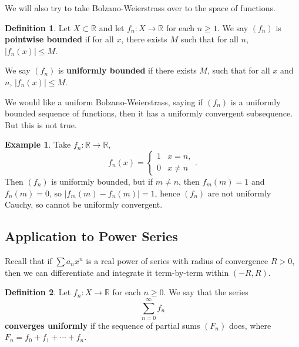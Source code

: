 \documentclass[12pt]{article}
\theoremstyle{definition}
\newtheorem{definition}{Definition}[section]
\newtheorem{example}{Example}[section]
\theoremstyle{remark}
\begin{document}
We will also try to take Bolzano-Weierstrass over to the space of functions.

\begin{definition}
	Let $X \subset \mathbb{R}$ and let $f_n : X \to \mathbb{R}$ for each $n \geq 1$. We say $(f_n)$ is \textbf{pointwise bounded} if for all $x$, there exists $M$ such that for all $n$, $|f_n(x)| \leq M$.

	We say $(f_n)$ is \textbf{uniformly bounded} if there exists $M$, such that for all $x$ and $n$, $|f_n(x)| \leq M$.
\end{definition}

We would like a uniform Bolzano-Weierstrass, saying if $(f_n)$ is a uniformly bounded sequence of functions, then it has a uniformly convergent subsequence. But this is not true.

\begin{adjustbox}{minipage = \columnwidth - 25.5pt, margin=1em, frame=1pt, margin=0em}
\begin{example}
	Take $f_n : \mathbb{R} \to \mathbb{R}$, 
	\[
		f_n(x) =
		\begin{cases}
			1 & x = n,\\
			0 & x \neq n
		\end{cases}
	.\]
	Then $(f_n)$ is uniformly bounded, but if $m \neq n$, then $f_m(m) = 1$ and $f_n(m) = 0$, so $|f_m(m) - f_n(m)| = 1$, hence $(f_n)$ are not uniformly Cauchy, so cannot be uniformly convergent.
\end{example}

\end{adjustbox}

\subsection{Application to Power Series}%
\label{sub:application_to_power_series}

Recall that if $\sum a_n x^{n}$ is a real power of series with radius of convergence $R > 0$, then we can differentiate and integrate it term-by-term within $(-R, R)$.

\begin{definition}
	Let $f_n : X \to \mathbb{R}$ for each $n \geq 0$. We say that the series
	\[
	\sum_{n = 0}^{\infty}f_n
	\]
	\textbf{converges uniformly} if the sequence of partial sums $(F_n)$ does, where $F_n = f_0 + f_1 + \cdots + f_n$.
\end{definition}
\end{document}
